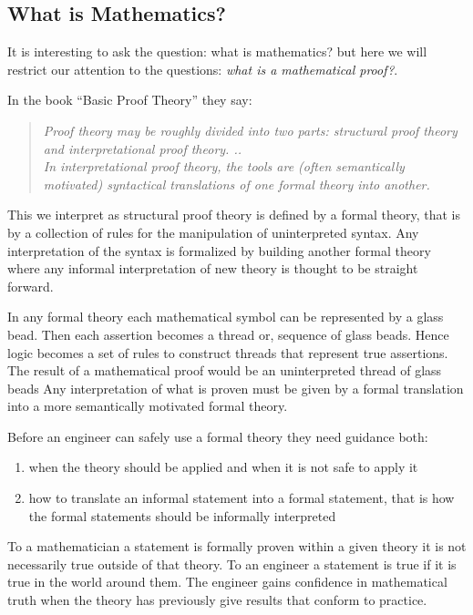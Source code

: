 \subsection{What is Mathematics?}
It is interesting to ask the question: what is mathematics? but here we will restrict our attention to the questions: \emph{what is a mathematical proof?}.

In \cite{BPT00} the book ``Basic Proof Theory'' they say: %
\begin{quotation}
\emph{Proof theory may be roughly divided into two parts: structural proof theory and interpretational proof theory. .. \\
In interpretational proof theory, the tools are (often semantically motivated) syntactical translations of one formal theory into another. }
\end{quotation}

This we interpret as structural proof theory is defined by a formal theory, that is by a collection of rules for the manipulation of uninterpreted syntax. Any interpretation of the syntax is formalized by building another formal theory  where any informal interpretation of  new theory is thought to be straight forward.

In any formal theory each mathematical symbol can be represented by a glass bead. Then each assertion becomes a thread or,  sequence of glass beads.  Hence logic becomes a set of rules to construct  threads that represent true assertions. The result of a mathematical proof would be an uninterpreted  thread of glass beads  Any interpretation of  what is proven must be given by a formal translation into a more semantically motivated formal theory.

Before an engineer can safely  use a formal theory  they need guidance both:
\begin{enumerate}
\item when the theory should be applied and when it is not safe to apply it
\item how to translate an informal statement into a formal statement, that is how the formal statements should be informally interpreted
\end{enumerate}

To a mathematician a statement is formally proven within a given theory it is not necessarily true outside of that theory. To an engineer a statement is true if it is true in the world around them. The engineer gains confidence in  mathematical truth when the theory has previously give results that conform to practice.


